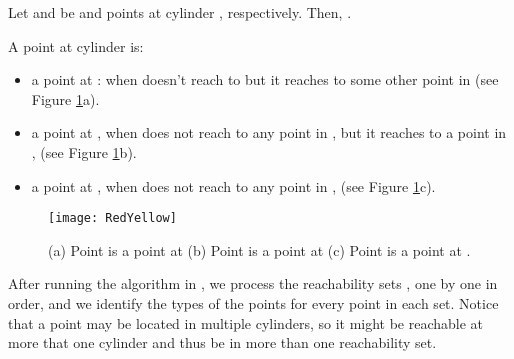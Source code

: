 \documentclass[a4paper,UKenglish]{lipics}
\begin{document}
\begin{obs} \label{obs:orderABC}
Let  and  be  and   points at cylinder , 
respectively. Then, .
\end{obs}

\begin{obs}
A  point  at cylinder  is:
\begin{itemize}
\item a  point at  : when  
doesn't reach to  but it reaches to 
some other point  in  
(see Figure \ref{fig:types}a). 

\item a  point at ,
when  does not reach to 
any point in , 
but it reaches to a point in ,
 (see Figure \ref{fig:types}b).

\item a  point at ,
when  does not reach to 
any point in ,  (see Figure \ref{fig:types}c).

\end{itemize}

\end{obs}

\begin{figure}[t]
	\centering
	\texttt{[image: RedYellow]}
	\caption{(a) Point  is a  point at  
(b) Point  is a  point at  (c) Point  is a  point at .}
	\label{fig:types}
\end{figure}


After running the algorithm in \cite{cccg11},
we process the reachability sets , one by one in order, 
and we identify the types of the points for every point in each set. 
Notice that a point  may be located in 
multiple cylinders, so it might be reachable 
at more that one cylinder and thus
be in more than one reachability set.
\end{document}
